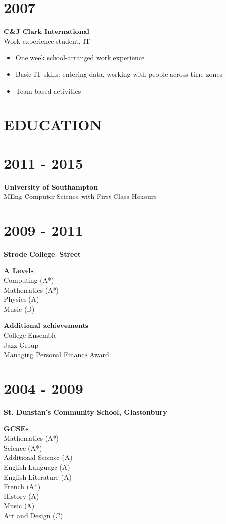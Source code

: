 \documentclass[margin]{res}
\begin{document}
\begin{resume}
\normalsize{\section{2007}}
{\bf C\&J Clark International} \\
Work experience student, IT \\
\begin{itemize}
\item One week school-arranged work experience
\item Basic IT skills: entering data, working with people across time zones
\item Team-based activities
\end{itemize}

\section{EDUCATION}
\normalsize{\section{2011 - 2015}}
{\bf University of Southampton} \\
MEng Computer Science with First Class Honours \\
\normalsize{\section{2009 - 2011}}
{\bf Strode College, Street}

{\bf A Levels} \\
Computing (A*) \\
Mathematics (A*) \\
Physics (A) \\
Music (D)

{\bf Additional achievements} \\
College Ensemble \\
Jazz Group \\
Managing Personal Finance Award

\normalsize{\section{2004 - 2009}}
{\bf St. Dunstan's Community School, Glastonbury}

{\bf GCSEs} \\
Mathematics (A*) \\
Science (A*) \\
Additional Science (A) \\
English Language (A) \\
English Literature (A) \\
French (A*) \\
History (A) \\
Music (A) \\
Art and Design (C)


\end{resume}
\end{document}
